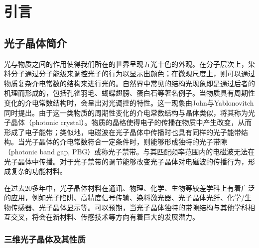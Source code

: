 
\chapter{引言}
\label{ch:intro}

\section{光子晶体简介}
\label{sec:intro_PhC}

光与物质之间的作用使得我们所在的世界呈现五光十色的外观。在分子层次上，染料分子通过分子能级来调控光子的行为以显示出颜色；在微观尺度上，则可以通过物质复杂介电常数的结构来进行光的。自然界中常见的结构光现象即是通过后者的机理而形成的\cite{Ball2012NatureS}，包括孔雀羽毛、蝴蝶翅膀、蛋白石等著名例子。当物质具有周期性变化的介电常数结构时，会呈出对光调控的特性。这一现象由John与Yablonovitch同时提出\cite{John1987Strong,Yablonovitch1987Inhibited}。由于这一类物质的周期性变化的介电常数结构与晶体类似，将其称为光子晶体（photonic crystal）。物质的晶格使得电子的传播在物质中产生改变，从而形成了电子能带；类似地，电磁波在光子晶体中传播时也具有同样的光子能带结构。当光子晶体的介电常数符合一定条件时，则能够形成独特的光子带隙（photonic band gap, PBG）或称光子禁带。与其匹配频率范围内的电磁波无法在光子晶体中传播。对于光子禁带的调节能够改变光子晶体对电磁波的传播行为，形成复杂的功能材料。

在过去20多年中，光子晶体材料在通讯、物理、化学、生物等较差学科上有着广泛的应用，例如光子陷阱\cite{Baba2008Slow}、高精度信号传输\cite{Adawi2010Optical}、染料激光器\cite{Scofield2011BottomUpa}、光子晶体光纤\cite{Consales2012LabOnFiber,Wang2013FiberOptic}、化学/生物传感器\cite{Zhao2010Photonic}、光子晶体显示\cite{Arsenault2007PhotonicCrystal}等。可以预期，当光子晶体独特的带隙结构与其他学科相互交叉，将会在新材料、传感技术等方向有着巨大的发展潜力。

\subsection{三维光子晶体及其性质}
\label{subsec:3DPhC}

